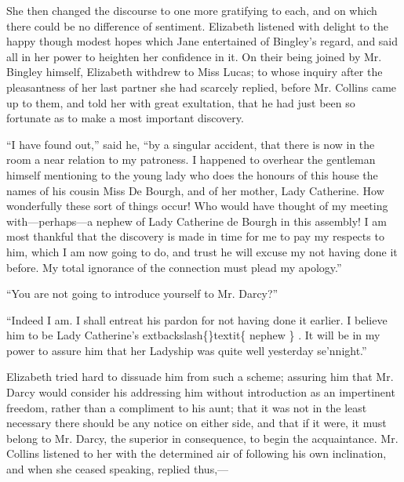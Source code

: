 \documentclass[10pt]{book}
\begin{document}
   She then changed the discourse to one more gratifying
   to each, and on
which there could be no difference of sentiment. Elizabeth listened with
delight to the happy though modest hopes which Jane entertained of
Bingley’s regard, and said all in her power to heighten her confidence
in it. On their being joined by Mr. Bingley himself, Elizabeth withdrew
to Miss Lucas; to whose inquiry after the pleasantness of her last
partner she had scarcely replied, before Mr. Collins came up to them,
and told her with great exultation, that he had just been so fortunate
as to make a most important discovery.
  

   “I have found out,” said he, “by a singular accident, that there is now
in the room a near relation to my patroness. I happened to overhear the
gentleman himself mentioning to the young lady who does the honours of
this house the names of his cousin Miss De Bourgh, and of her mother,
Lady Catherine. How wonderfully these sort of things occur! Who would
have thought of my meeting with—perhaps—a nephew of Lady Catherine de
Bourgh in this assembly! I am most thankful that the discovery is made
in time for me to pay my respects to him, which I am now going to do,
and trust he will excuse my not having done it before. My total
ignorance of the connection must plead my apology.”
  

   “You are not going to introduce yourself to Mr. Darcy?”
  

   “Indeed I am. I shall entreat his pardon for not having done it earlier.
I believe him to be Lady Catherine’s
   	extbackslash\{\}textit\{
    nephew
   \}
   . It will be in my power to
assure him that her Ladyship was quite well yesterday se’nnight.”
  

   Elizabeth tried hard to dissuade him from such a scheme; assuring him
that Mr. Darcy would consider his addressing him without introduction as
an impertinent
   freedom, rather than a compliment to his aunt; that it
was not in the least necessary there should be any notice on either
side, and that if it were, it must belong to Mr. Darcy, the superior in
consequence, to begin the acquaintance. Mr. Collins listened to her with
the determined air of following his own inclination, and when she ceased
speaking, replied thus,—
  
\end{document}
